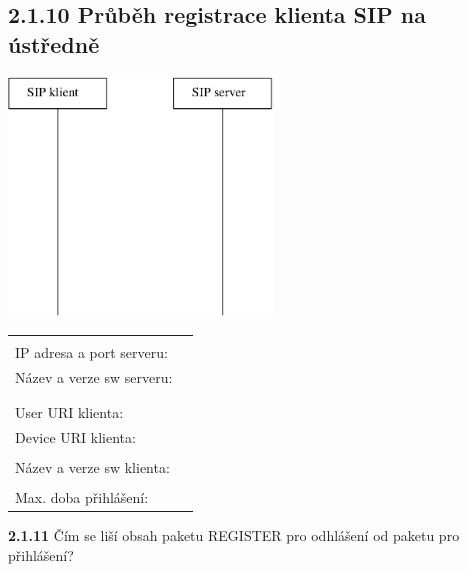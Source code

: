 \documentclass[a4paper,11pt]{article}
\begin{document}
\subsection*{2.1.10 Průběh registrace klienta SIP na ústředně}
\begin{multicols}{2}
  \begin{center}
    \includegraphics[width=70mm]{img/registrace.eps}
  \end{center}
  \columnbreak
  
  \begin{tabular}{lp{2cm}}
    &\\
    IP adresa a port serveru: &\\
    Název a verze sw serveru: &\\
    &\\
    &\\
    User URI klienta: &\\
    Device URI klienta: &\\
    &\\
    Název a verze sw klienta: &\\
    &\\
    Max. doba přihlášení: &\\
  \end{tabular}               
\end{multicols}
   {\bf 2.1.11} Čím se liší obsah paketu REGISTER pro odhlášení od paketu pro přihlášení?
\end{document}

